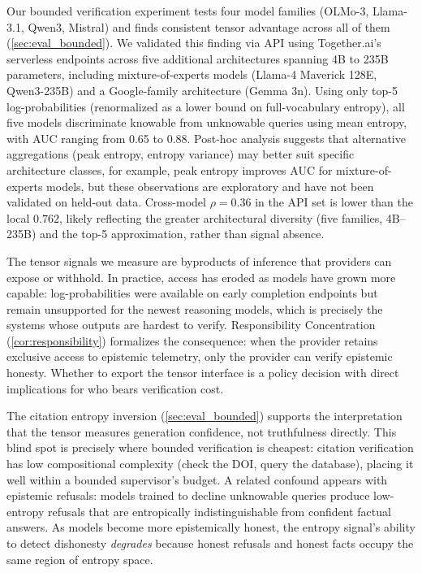 Our bounded verification experiment tests four model families (OLMo-3, Llama-3.1,
Qwen3, Mistral) and finds consistent tensor advantage across all of them
(\autoref{sec:eval_bounded}).
%
We validated this finding via API using Together.ai's serverless endpoints
across five additional architectures spanning 4B to 235B parameters, including
mixture-of-experts models (Llama-4 Maverick 128E, Qwen3-235B) and a
Google-family architecture (Gemma 3n). Using only top-5 log-probabilities
(renormalized as a lower bound on full-vocabulary entropy), all five models
discriminate knowable from unknowable queries using mean entropy, with AUC
ranging from 0.65 to 0.88. Post-hoc analysis suggests that alternative
aggregations (peak entropy, entropy variance) may better suit specific
architecture classes, for example, peak entropy improves AUC for
mixture-of-experts models, but these observations are exploratory and have
not been validated on held-out data.
Cross-model $\rho = 0.36$ in the API set is lower than the local $0.762$,
likely reflecting the greater architectural diversity (five families, 4B--235B)
and the top-5 approximation, rather than signal absence.

The tensor signals we measure are byproducts of inference that providers can
expose or withhold. In practice, access has eroded as models have grown more
capable: log-probabilities were available on early completion endpoints but
remain unsupported for the newest reasoning models, which is precisely the systems
whose outputs are hardest to verify. Responsibility Concentration
(\autoref{cor:responsibility}) formalizes the consequence: when the provider
retains exclusive access to epistemic telemetry, only the provider can verify
epistemic honesty. Whether to export the tensor interface is a policy
decision with direct implications for who bears verification cost.

 The citation entropy inversion
(\autoref{sec:eval_bounded}) supports the interpretation that the tensor
measures generation confidence, not truthfulness directly. This blind spot is
precisely where bounded verification is cheapest: citation verification has
low compositional complexity (check the DOI, query the database), placing it
well within a bounded supervisor's budget.
A related confound appears with epistemic refusals: models trained to decline
unknowable queries produce low-entropy refusals that are entropically
indistinguishable from confident factual answers. As models become more
epistemically honest, the entropy signal's ability to detect dishonesty
\emph{degrades} because honest refusals and honest facts occupy the same
region of entropy space.

